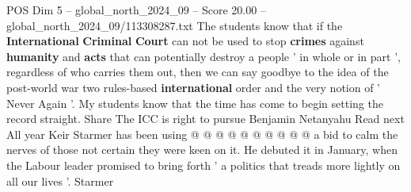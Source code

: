 \begin{textsample}{POS Dim 5 – global\_north\_2024\_09 – Score 20.00 – global\_north\_2024\_09/113308287.txt}
The students know that if the \textbf{International} \textbf{Criminal} \textbf{Court} can not be used to stop \textbf{crimes} against \textbf{humanity} and \textbf{acts} that can potentially destroy a people ' in whole or in part ', regardless of who carries them out, then we can say goodbye to the idea of the post-world war two rules-based \textbf{international} order and the very notion of ' Never Again '.
My students know that the time has come to begin setting the record straight.
Share The ICC is right to pursue Benjamin Netanyahu Read next All year Keir Starmer has been using @ @ @ @ @ @ @ @ @ @ a bid to calm the nerves of those not certain they were keen on it.
He debuted it in January, when the Labour leader promised to bring forth ' a politics that treads more lightly on all our lives '.
Starmer

\end{textsample}
